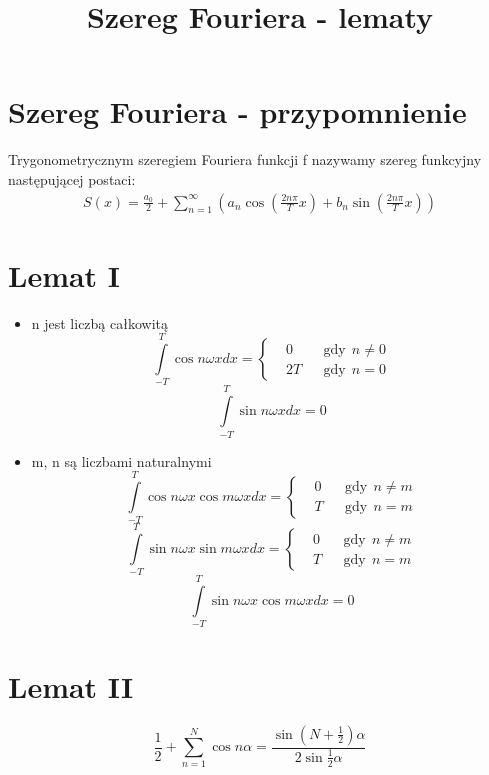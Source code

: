 \documentclass{article}
\begin{document}
\title{Szereg Fouriera - lematy}
\maketitle

\section*{Szereg Fouriera - przypomnienie}
Trygonometrycznym szeregiem Fouriera funkcji f nazywamy szereg funkcyjny następującej postaci: 
\begin{gather*}
S(x)={\frac {a_{0}}{2}}+\sum _{n=1}^{\infty }\left(a_{n}\cos \left({\frac {2n\pi }{T}}x\right)+b_{n}\sin \left({\frac {2n\pi }{T}}x\right)\right)
\end{gather*}

\section*{Lemat I}
\begin{itemize}
\item n jest liczbą całkowitą
\[ \int \limits _{-T}^{T}\cos n\omega xdx=\left\{{\begin{aligned}&0&&{\text{gdy}}~~n\neq 0\\&2T&&{\text{gdy}}~~n=0\end{aligned}}\right. \]
\[ \int \limits _{-T}^{T}\sin n\omega xdx=0 \]

\item m, n są liczbami naturalnymi
\[ \int \limits _{-T}^{T}\cos n\omega x\cos m\omega xdx=\left\{{\begin{aligned}&0&&{\text{gdy}}~~n\neq m\\&T&&{\text{gdy}}~~n=m\end{aligned}}\right. \]
\[ \int \limits _{-T}^{T}\sin n\omega x\sin m\omega xdx=\left\{{\begin{aligned}&0&&{\text{gdy}}~~n\neq m\\&T&&{\text{gdy}}~~n=m\end{aligned}}\right. \]
\[ \int \limits _{-T}^{T}\sin n\omega x\cos m\omega xdx=0 \]
\end{itemize}

\section*{Lemat II}
$$ {\frac {1}{2}}+\sum _{n=1}^{N}\cos n\alpha ={\frac {\sin \left(N+{\frac {1}{2}}\right)\alpha }{2\sin {\frac {1}{2}}\alpha }} $$
\end{document}
